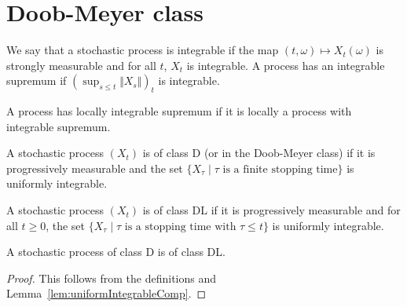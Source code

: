 \section{Doob-Meyer class}

\begin{definition}\label{def:HasIntegrableSup}
  \leanok
We say that a stochastic process is integrable if the map $(t,\omega) \mapsto X_t(\omega)$ is strongly measurable and for all $t$, $X_t$ is integrable.
A process has an integrable supremum if $(\sup_{s \le t} \Vert X_s \Vert)_t$ is integrable.
\end{definition}


\begin{definition}\label{def:locallyIntegrableSup}
  \leanok
A process has locally integrable supremum if it is locally a process with integrable supremum.
\end{definition}


\begin{definition}\label{def:classD}
  \leanok
A stochastic process $(X_t)$ is of class D (or in the Doob-Meyer class) if it is progressively measurable and the set $\{X_\tau \mid \tau \text{ is a finite stopping time}\}$ is uniformly integrable.
\end{definition}


\begin{definition}[Class DL]\label{def:classDL}
  \leanok
A stochastic process $(X_t)$ is of class DL if it is progressively measurable and for all $t \ge 0$, the set $\{X_\tau \mid \tau \text{ is a stopping time with } \tau \le t\}$ is uniformly integrable.
\end{definition}


\begin{lemma}\label{lem:classDLOfClassD}
  \leanok
A stochastic process of class D is of class DL.
\end{lemma}

\begin{proof}
  \leanok
This follows from the definitions and Lemma~\ref{lem:uniformIntegrableComp}.
\end{proof}


